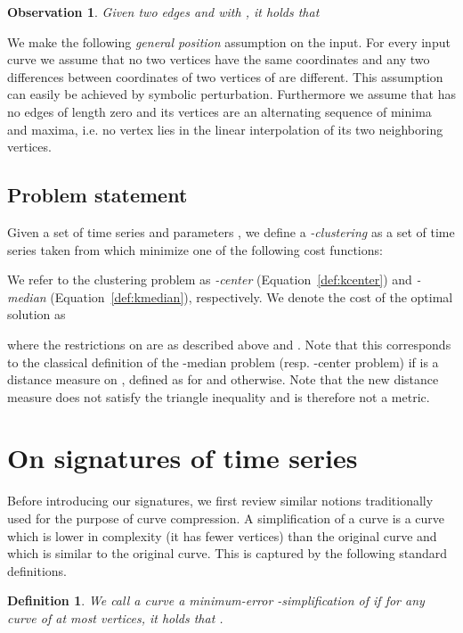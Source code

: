\documentclass[11pt, letter]{article}
\newtheorem{definition}[theorem]{Definition}
\newtheorem{observation}[theorem]{Observation}
\newcommand{\seclab}[1]{\label{sec:#1}}
\newcommand{\deflab}[1]{\label{def:#1}}
\newcommand{\obslab}[1]{\label{obs:#1}}
\begin{document}
\begin{observation}\obslab{segments}
Given two edges  and  with , it holds that 

\end{observation}

We make the following \emph{general position} assumption on the input. For every
input curve  we assume that no two vertices  have
the same coordinates and any two differences between coordinates of two
vertices of  are different. This assumption can easily be achieved
by symbolic perturbation. Furthermore we assume that  has no edges 
of length zero and its vertices are an alternating sequence of minima and
maxima, i.e. no vertex lies in the linear interpolation of its two neighboring vertices.

\subsection{Problem statement}
\seclab{problem}

Given a set of  time series  and parameters , we define a \emph{-clustering}  as a set of  time series  taken from   which minimize one of the following cost functions:
 

 

We refer to the clustering problem as 
\emph{-center} (Equation~\ref{def:kcenter}) 
and \emph{-median} (Equation~\ref{def:kmedian}),
respectively. 
We denote the cost of the optimal solution as 

where the restrictions on  are as described above and .
Note that this corresponds to the classical definition of the -median problem (resp. -center problem) 
if  is a distance measure on , 
defined as  for 
and  otherwise. Note that the new distance measure 
does not satisfy the triangle inequality and is therefore not a metric.

\section{On signatures of time series}
\seclab{on:signatures}

Before introducing our signatures, we first review similar notions traditionally
used for the purpose of curve compression. 
A simplification of a curve is a curve which is lower in complexity (it has
fewer vertices) than the original curve and which is similar to the original
curve. This is captured by the following standard definitions.  

\begin{definition}\deflab{min:error:simp}
We call a curve  a minimum-error -simplification of  if
for any curve  of at most  vertices, it holds that
.
\end{definition}
\end{document}
